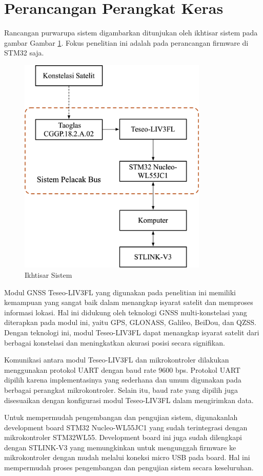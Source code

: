 \section{Perancangan Perangkat Keras}
Rancangan purwarupa sistem digambarkan ditunjukan oleh ikhtisar sistem pada gambar Gambar  \ref{Fig: system-overview}. Fokus penelitian ini adalah pada perancangan firmware di STM32 saja. 

\begin{figure}[H]
	\centering
	\includegraphics[width=9cm]{contents/chapter-3/system-overview.png}
	\caption{Ikhtisar Sistem}
	\label{Fig: system-overview}
\end{figure}

Modul GNSS Teseo-LIV3FL yang digunakan pada penelitian ini memiliki kemampuan yang sangat baik dalam menangkap isyarat satelit dan memproses informasi lokasi. Hal ini didukung oleh teknologi GNSS multi-konstelasi yang diterapkan pada modul ini, yaitu GPS, GLONASS, Galileo, BeiDou, dan QZSS. Dengan teknologi ini, modul Teseo-LIV3FL dapat menangkap isyarat satelit dari berbagai konstelasi dan meningkatkan akurasi posisi secara signifikan.

Komunikasi antara modul Teseo-LIV3FL dan mikrokontroler dilakukan menggunakan protokol UART dengan baud rate 9600 bps. Protokol UART dipilih karena implementasinya yang sederhana dan umum digunakan pada berbagai perangkat mikrokontroler. Selain itu, baud rate yang dipilih juga disesuaikan dengan konfigurasi modul Teseo-LIV3FL dalam mengirimkan data.

Untuk mempermudah pengembangan dan pengujian sistem, digunakanlah development board STM32 Nucleo-WL55JC1 yang sudah terintegrasi dengan mikrokontroler STM32WL55. Development board ini juga sudah dilengkapi dengan STLINK-V3 yang memungkinkan untuk mengunggah firmware ke mikrokontroler dengan mudah melalui koneksi micro USB pada board. Hal ini mempermudah proses pengembangan dan pengujian sistem secara keseluruhan.

